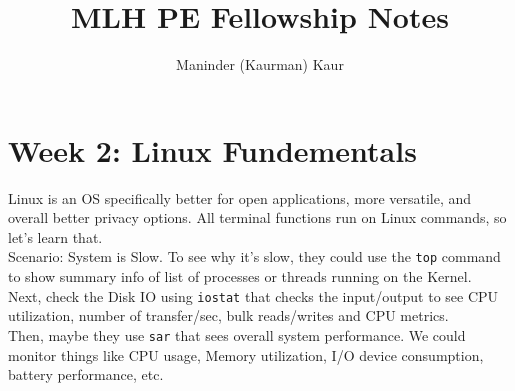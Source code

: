 \documentclass[11pt]{article}
\title{MLH PE Fellowship Notes}
\author{Maninder (Kaurman) Kaur}
\begin{document}
\maketitle

\section*{Week 2: Linux Fundementals}

Linux is an OS specifically better for open applications, more versatile, and overall better privacy options. All terminal functions run on Linux commands, so let's learn that. \\
\noindent Scenario: System is Slow. To see why it's slow, they could use the \texttt{top} command to show summary info of list of processes or threads running on the Kernel. \\
Next, check the Disk IO using \texttt{iostat} that checks the input/output to see CPU utilization, number of transfer/sec, bulk reads/writes and CPU metrics. \\
Then, maybe they use \texttt{sar} that sees overall system performance. We could monitor things like CPU usage, Memory utilization, I/O device consumption, battery performance, etc. \\
\end{document}
